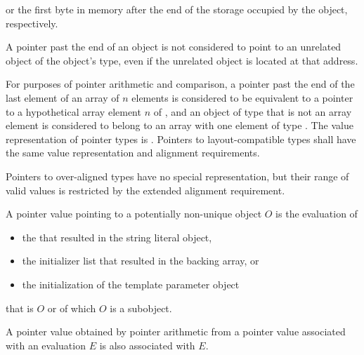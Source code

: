 or the first byte in memory
after the end of the storage occupied by the object,
respectively.
\begin{note}
A pointer past the end of an object
is not considered to point to an unrelated object
of the object's type,
even if the unrelated object is located at that address.
\end{note}
For purposes of pointer arithmetic
and comparison,
a pointer past the end of the last element of
an array  of $n$ elements
is considered to be equivalent to
a pointer to a hypothetical array element $n$ of , and
an object of type  that is not an array element
is considered to belong to an array with one element of type .
The value representation of
pointer types is . Pointers to
layout-compatible types shall
have the same value representation and alignment
requirements.
\begin{note}
Pointers to over-aligned types have no special
representation, but their range of valid values is restricted by the extended
alignment requirement.
\end{note}

\pnum
A pointer value
pointing to a potentially non-unique object $O$ is
%
 the evaluation of
\begin{itemize}
\item
the  that resulted in the string literal object,
\item
the initializer list that resulted in the backing array,
or
\item
the initialization of
the template parameter object
\end{itemize}
that is $O$ or of which $O$ is a subobject.
\begin{note}
A pointer value obtained by pointer arithmetic
from a pointer value associated with an evaluation $E$
is also associated with $E$.
\end{note}

